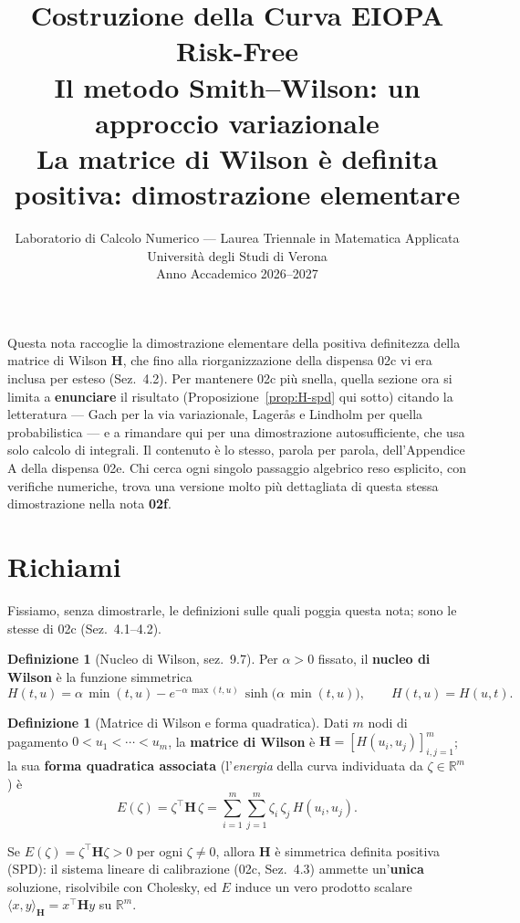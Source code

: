 \documentclass[11pt,a4paper]{article}
\title{%
  \textbf{Costruzione della Curva EIOPA Risk-Free}\\[6pt]
  \large Il metodo Smith--Wilson: un approccio variazionale\\[4pt]
  \normalsize La matrice di Wilson è definita positiva: dimostrazione elementare\\[2pt]
}
\author{Laboratorio di Calcolo Numerico --- Laurea Triennale in Matematica Applicata\\
  Universit\`a degli Studi di Verona\\[2pt]
  Anno Accademico 2026--2027}
\date{}
\theoremstyle{plain}
\theoremstyle{definition}
\newtheorem{definizione}[teorema]{Definizione}
\theoremstyle{remark}
\newcommand{\Hmat}{\mathbf{H}}
\newcommand{\transp}{^{\!\top}}
\begin{document}
\maketitle
\tableofcontents
\newpage

\noindent
Questa nota raccoglie la dimostrazione elementare della positiva definitezza della matrice di
Wilson $\Hmat$, che fino alla riorganizzazione della dispensa 02c vi era inclusa per esteso
(Sez.~4.2). Per mantenere 02c pi\`u snella, quella sezione ora si limita a \textbf{enunciare} il
risultato (Proposizione~\ref{prop:H-spd} qui sotto) citando la letteratura --- Gach
\cite{gach2017} per la via variazionale, Lager\aa s e Lindholm \cite{lageras2016} per quella
probabilistica --- e a rimandare qui per una dimostrazione autosufficiente, che usa solo
calcolo di integrali. Il contenuto \`e lo stesso, parola per parola, dell'Appendice A della
dispensa 02e. Chi cerca ogni singolo passaggio algebrico reso esplicito, con verifiche
numeriche, trova una versione molto pi\`u dettagliata di questa stessa dimostrazione nella nota
\textbf{02f}.

\section{Richiami}
\label{sec:richiami}

Fissiamo, senza dimostrarle, le definizioni sulle quali poggia questa nota; sono le stesse di
02c (Sez.~4.1--4.2).

\begin{definizione}[Nucleo di Wilson, \cite{eiopa2025} sez.~9.7]
Per $\alpha>0$ fissato, il \textbf{nucleo di Wilson} è la funzione simmetrica
\[
  H(t,u) = \alpha\,\min(t,u) - e^{-\alpha\,\max(t,u)}\,\sinh\!\bigl(\alpha\,\min(t,u)\bigr),
  \qquad H(t,u)=H(u,t).
\]
\end{definizione}

\begin{definizione}[Matrice di Wilson e forma quadratica]
Dati $m$ nodi di pagamento $0<u_1<\cdots<u_m$, la \textbf{matrice di Wilson} è
$\Hmat = [H(u_i,u_j)]_{i,j=1}^m$; la sua \textbf{forma quadratica associata} (l'\emph{energia}
della curva individuata da $\zeta\in\mathbb{R}^m$) è
\[
  E(\zeta) = \zeta\transp\Hmat\,\zeta = \sum_{i=1}^m\sum_{j=1}^m \zeta_i\,\zeta_j\,H(u_i,u_j).
\]
\end{definizione}

\begin{keybox}
Se $E(\zeta)=\zeta\transp\Hmat\zeta>0$ per ogni $\zeta\neq 0$, allora $\Hmat$ è simmetrica
definita positiva (SPD): il sistema lineare di calibrazione (02c, Sez.~4.3) ammette
un'\textbf{unica} soluzione, risolvibile con Cholesky, ed $E$ induce un vero prodotto scalare
$\langle x,y\rangle_\Hmat = x\transp\Hmat y$ su $\mathbb{R}^m$.
\end{keybox}
\end{document}
